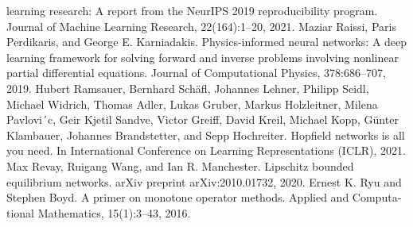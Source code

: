 \documentclass{article}
\begin{document}
learning research: A report from the NeurIPS 2019 reproducibility program. Journal of Machine
Learning Research, 22(164):1--20, 2021.
Maziar Raissi, Paris Perdikaris, and George E. Karniadakis. Physics-informed neural networks: A
deep learning framework for solving forward and inverse problems involving nonlinear partial
differential equations. Journal of Computational Physics, 378:686--707, 2019.
Hubert Ramsauer, Bernhard Sch\"afl, Johannes Lehner, Philipp Seidl, Michael Widrich, Thomas
Adler, Lukas Gruber, Markus Holzleitner, Milena Pavlovi´c, Geir Kjetil Sandve, Victor Greiff,
David Kreil, Michael Kopp, G\"unter Klambauer, Johannes Brandstetter, and Sepp Hochreiter.
Hopfield networks is all you need. In International Conference on Learning Representations
(ICLR), 2021.
Max Revay, Ruigang Wang, and Ian R. Manchester. Lipschitz bounded equilibrium networks. arXiv
preprint arXiv:2010.01732, 2020.
Ernest K. Ryu and Stephen Boyd. A primer on monotone operator methods. Applied and Computa-
tional Mathematics, 15(1):3--43, 2016.
\clearpage

\end{document}
